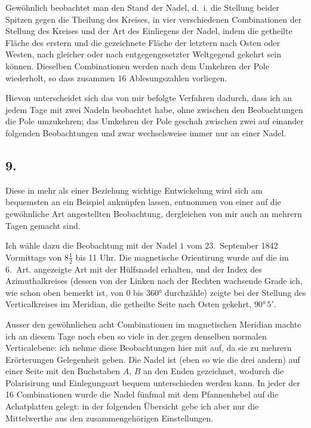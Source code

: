 \documentclass[12pt,a4paper]{article}
\begin{document}
Gewöhnlich beobachtet man den Stand der Nadel, d.~i. die Stellung beider Spitzen gegen die Theilung des Kreises, in vier verschiedenen Combinationen der Stellung des Kreises und der Art des Einliegens der Nadel, indem die getheilte Fläche des erstern und die gezeichnete Fläche der letztern nach Osten oder Westen, nach gleicher oder nach entgegengesetzter Weltgegend gekehrt sein können. Dieselben Combinationen werden nach dem Umkehren der Pole wiederholt, so dass zusammen 16 Ablesungszahlen vorliegen.

Hievon unterscheidet sich das von mir befolgte Verfahren dadurch, dass ich an jedem Tage mit zwei Nadeln beobachtet habe, ohne zwischen den Beobachtungen die Pole umzukehren; das Umkehren der Pole geschah zwischen zwei auf einander folgenden Beobachtungen und zwar wechselsweise immer nur an einer Nadel.

\subsection*{9.}
Diese in mehr als einer Beziehung wichtige Entwickelung wird sich am bequemsten an ein Beispiel anknüpfen lassen, entnommen von einer auf die gewöhnliche Art angestellten Beobachtung, dergleichen von mir auch an mehrern Tagen gemacht sind.

Ich wähle dazu die Beobachtung mit der Nadel $1$ vom 23.~September 1842 Vormittags von 8$\frac{1}{2}$ bis 11 Uhr. Die magnetische Orientirung wurde auf die im 6.~Art. angezeigte Art mit der Hülfsnadel erhalten, und der Index des Azimuthalkreises (dessen von der Linken nach der Rechten wachsende Grade ich, wie schon oben bemerkt ist, von $0$ bis $360°$ durchzähle) zeigte bei der Stellung des Verticalkreises im Meridian, die getheilte Seite nach Osten gekehrt, $90°\,5'$.

Ausser den gewöhnlichen acht Combinationen im magnetischen Meridian machte ich an diesem Tage noch eben so viele in der gegen denselben normalen Verticalebene: ich nehme diese Beobachtungen hier mit auf, da sie zu mehrern Erörterungen Gelegenheit geben. Die Nadel ist (eben so wie die drei andern) auf einer Seite mit den Buchstaben $A$, $B$ an den Enden gezeichnet, wodurch die Polarisirung und Einlegungsart bequem unterschieden werden kann. In jeder der 16 Combinationen wurde die Nadel fünfmal mit dem Pfannenhebel auf die Achatplatten gelegt: in der folgenden Übersicht gebe ich aber nur die Mittelwerthe aus den zusammengehörigen Einstellungen.
\end{document}
